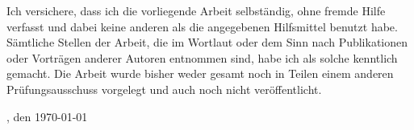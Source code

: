 Ich versichere, dass ich die vorliegende Arbeit selbständig, ohne fremde Hilfe verfasst
und dabei keine anderen als die angegebenen Hilfsmittel benutzt habe.
Sämtliche Stellen der Arbeit, die im Wortlaut oder dem Sinn nach Publikationen
oder Vorträgen anderer Autoren entnommen sind, habe ich als solche kenntlich
gemacht. Die Arbeit wurde bisher weder gesamt noch in Teilen einem
anderen Prüfungsausschuss vorgelegt und auch noch nicht veröffentlicht.

\vspace{1.5cm}

\begin{flushright}
    \ort, den \today

    \vspace{0.7cm}
    \vorname \space \nachname
\end{flushright}